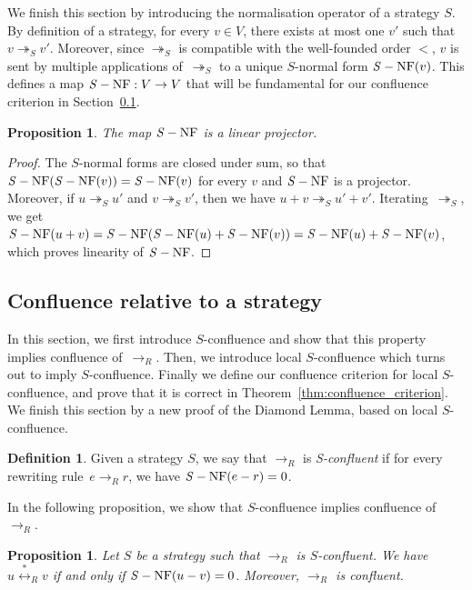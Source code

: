 \documentclass[10pt]{easychair}
\newtheorem{proposition}[theorem]{Proposition}
\theoremstyle{definition}
\newtheorem{definition}[theorem]{Definition}
\newcommand\rewR{\to_R}
\newcommand\rewS{\twoheadrightarrow_S}
\newcommand\equivR{\overset{*}{\leftrightarrow}_R}
\DeclareMathOperator{\NF}{{\it S}-NF}
\begin{document}
We finish this section by introducing the normalisation operator of a
strategy $S$. By definition of a strategy, for every $v\in V$, there
exists at most one $v'$ such that $v\rewS v'$. Moreover, since $\rewS$ is
compatible with the well-founded order $<$, $v$ is sent by multiple
applications of~$\rewS$ to a unique $S$-normal form $\NF(v)$. This
defines a map $\NF:V\to V$ that will be fundamental for our confluence
criterion in Section~\ref{sec:confluence_relative_to_a_strategy}.
\medskip

\begin{proposition}\label{prop:linearity_of_H}
  The map $\NF$ is a linear projector.
\end{proposition}

\begin{proof}
  The $S$-normal forms are closed under sum, so that $\NF(\NF(v))=\NF(v)$
  for every $v$ and $\NF$ is a projector. Moreover, if $u\rewS u'$
  and $v\rewS v'$, then we have $u+v\rewS u'+v'$. Iterating~$\rewS$, we
  get $\NF(u+v)=\NF(\NF(u)+\NF(v))=\NF(u)+\NF(v)$, which proves linearity
  of $\NF$.
\end{proof}

\subsection{Confluence relative to a strategy}
\label{sec:confluence_relative_to_a_strategy}

In this section, we first introduce $S$-confluence and show that this
property implies confluence of~$\rewR$. Then, we introduce local
$S$-confluence which turns out to imply $S$-confluence. Finally we define
our confluence criterion for local $S$-confluence, and prove that it is
correct in Theorem~\ref{thm:confluence_criterion}. We finish this section
by a new proof of the Diamond Lemma, based on local $S$-confluence.
\smallskip

\begin{definition}\label{def:standardisation_property}
  Given a strategy $S$, we say that $\rewR$ is \emph{S-confluent} if for
  every rewriting rule~$e\rewR r$, we have $\NF(e-r)=0$.
\end{definition}
\smallskip

In the following proposition, we show that $S$-confluence implies
confluence of $\rewR$.
\medskip

\begin{proposition}\label{prop:h_and_R_confluence}
  Let $S$ be a strategy such that $\rewR$ is $S$-confluent. We have 
  $u\equivR v$ if and only if $\NF(u-v)=0$. Moreover, $\rewR$ is
  confluent.
\end{proposition}
\end{document}
